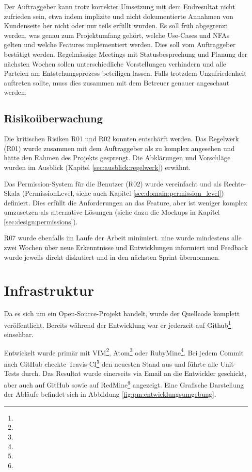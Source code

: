 {Der Auftraggeber kann trotz korrekter Umsetzung mit dem Endresultat nicht zufrieden sein, etwa indem implizite und nicht dokumentierte Annahmen von Kundenseite her nicht oder nur teils erfüllt wurden.}
{Es soll früh abgegrenzt werden, was genau zum Projektumfang gehört, welche Use-Cases und NFAs gelten und welche Features implementiert werden. Dies soll vom Auftraggeber bestätigt werden. Regelmässige Meetings mit Statusbesprechung und Planung der nächsten Wochen sollen unterschiedliche Vorstellungen verhindern und alle Parteien am Entstehungsprozess beteiligen lassen. Falls trotzdem Unzufriedenheit auftreten sollte, muss dies zusammen mit dem Betreuer genauer angeschaut werden.}

\subsection*{Risikoüberwachung}

Die kritischen Risiken R01 und R02 konnten entschärft werden. Das Regelwerk (R01) wurde zusammen mit dem Auftraggeber als zu komplex angesehen und hätte den Rahmen des Projekts gesprengt. Die Abklärungen und Vorschläge wurden im Ausblick (Kapitel \ref{sec:ausblick:regelwerk}) erwähnt.

Das Permission-System für die Benutzer (R02) wurde vereinfacht und als Rechte-Skala (PermissionLevel, siehe auch Kapitel \ref{sec:domain:permission_level}) definiert. Dies erfüllt die Anforderungen an das Feature, aber ist weniger komplex umzusetzen als alternative Lösungen (siehe dazu die Mockups in Kapitel \ref{sec:design:permissions}).

R07 wurde ebenfalls im Laufe der Arbeit minimiert. \gls{nine} wurde mindestens alle zwei Wochen über neue Erkenntnisse und Entwicklungen informiert und Feedback wurde jeweils direkt diskutiert und in den nächsten Sprint übernommen.


\section{Infrastruktur} \label{sec:pm:infrastructure}

Da es sich um ein Open-Source-Projekt handelt, wurde der Quellcode komplett veröffentlicht. Bereits während der Entwicklung war er jederzeit auf Github\footnote{} einsehbar.

Entwickelt wurde primär mit VIM\footnote{}, Atom\footnote{} oder RubyMine\footnote{}. Bei jedem Commit nach GitHub checkte Travis-CI\footnote{} den neuesten Stand aus und führte alle Unit-Tests durch. Das Resultat wurde einerseits via Email an die Entwickler geschickt, aber auch auf GitHub sowie auf RedMine\footnote{} angezeigt. Eine Grafische Darstellung der Abläufe befindet sich in Abbildung \ref{fig:pm:entwicklungsumgebung}.


